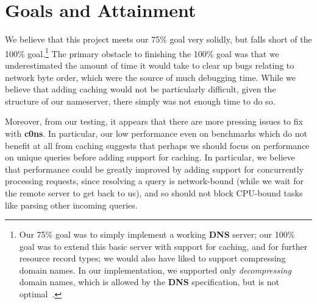 \documentclass{article}
\newcommand\Kwd[1]{{\sffamily\bfseries{#1}}}
\begin{document}
\section{Goals and Attainment}

We believe that this project meets our 75\% goal very solidly, but
falls short of the 100\% goal.\footnote{Our 75\% goal was to simply implement
  a working \Kwd{DNS} server; our 100\% goal was to extend this basic
  server with support for caching, and for further resource record
  types; we would also have liked to support compressing domain
  names. In our implementation, we supported only \emph{decompressing}
  domain names, which is allowed by the \Kwd{DNS} specification, but
  is not optimal~\citep{rfc:1035}.} The primary obstacle to finishing
the 100\% goal was that we underestimated the amount of time it would
take to clear up bugs relating to network byte order, which were the
source of much debugging time. While we believe that adding caching
would not be particularly difficult, given the structure of our
nameserver, there simply was not enough time to do so.

Moreover, from our testing, it appears that there are more pressing issues to fix with \Kwd{c0ns}. In  particular, our low performance even on benchmarks which do not benefit at all from caching suggests that perhaps we should focus on performance on unique queries before adding support for caching. In particular, we believe that performance could be greatly improved by adding support for concurrently processing requests, since resolving a query is network-bound (while we wait for the remote server to get back to us), and so should not block CPU-bound tasks like parsing other incoming queries.



\end{document}
